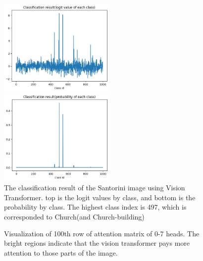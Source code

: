 \documentclass[extendedabs]{bmvc2k}
\begin{document}
\begin{figure}[thb] \centering
    
    \includegraphics[width=0.5\textwidth]{images/fig8.png}
    
    \includegraphics[width=0.5\textwidth]{images/fig9.png} 
    
    \caption{The classification result of the Santorini image using Vision Transformer. top is the logit values by class, and bottom is the probability by class. The highest class index is 497, which is corresponded to Church(and Church-building)} \label{fig:classificationres}
\end{figure}

\begin{figure}[t]
\centering
{}
	
	\caption{
		Visualization of 100th row of attention matrix of 0-7 heads. The bright regions indicate that the vision transformer pays more attention to those parts of the image.}
	\vspace{-2mm}
        \label{fig:attentionvis2}
\end{figure}

\newpage

\end{document}
